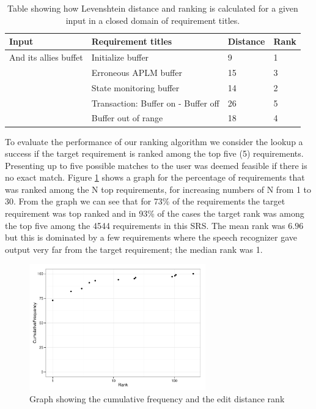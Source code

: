 \documentclass[conference]{IEEEtran}
\begin{document}
\begin{table}[h]
    \centering
    \caption{Table showing how Levenshtein distance and ranking is calculated for a given input in a closed domain of requirement titles.}
        \begin{tabular}{ | p{2.5cm} | p{2.5cm} | p{1cm} | p{0.5cm} |}
            \hline
            Input & Requirement titles & Distance & Rank\\
            \hline
            And its allies buffet & Initialize buffer & 9 & 1 \\
            \hline
             & Erroneous APLM buffer & 15 & 3 \\
             \hline
             & State monitoring buffer & 14 & 2 \\
             \hline
             & Transaction: Buffer on - Buffer off & 26 & 5 \\ 
             \hline
             & Buffer out of range & 18 & 4 \\ 
             \hline
            \end{tabular}
    \label{tab:experimentexample}
\end{table}
To evaluate the performance of our ranking algorithm we consider the lookup a success if the target requirement is ranked among the top five (5) requirements. 
Presenting up to five possible matches to the user was deemed feasible if there is no exact match.
Figure \ref{fig:freqperrank} shows a graph for the percentage of requirements that was ranked among the N top requirements, for increasing numbers of N from 1 to 30.
From the graph we can see that for 73\% of the requirements the target requirement was top ranked and in 93\% of the cases the target rank was among the top five among the 4544 requirements in this SRS.
The mean rank was $6.96$ but this is dominated by a few requirements where the speech recognizer gave output very far from the target requirement; the median rank was 1.

\begin{figure}[!t]

\centering
\includegraphics[width=3in]{pdf/freqperrank.pdf}
\caption{Graph showing the cumulative frequency and the edit distance rank}
\label{fig:freqperrank}
\end{figure}
\end{document}
